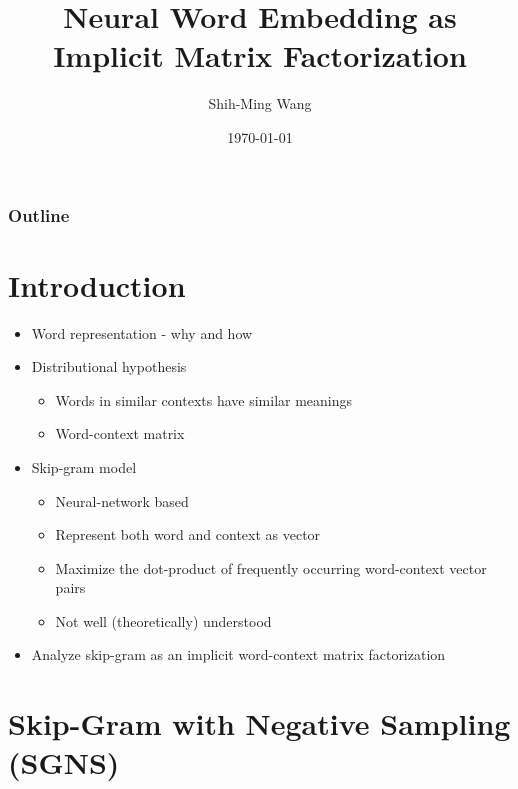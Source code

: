 \documentclass[compress]{beamer}
\title{Neural Word Embedding as Implicit Matrix Factorization}
\author{Shih-Ming Wang}
\institute{NLPLab, Institute of Information Science, Academia Sinica}
\date{\today}
\begin{document}
\beamertemplatenavigationsymbolsempty

\begin{frame}
 \maketitle
\end{frame}

\begin{frame}
 \frametitle{Outline}
 \tableofcontents
\end{frame}
\section{Introduction}
\begin{frame}{\secname}
\begin{itemize}
  \item Word representation - why and how
  \item Distributional hypothesis
    \begin{itemize}
      \item Words in similar contexts have similar meanings
      \item Word-context matrix
    \end{itemize}
\item Skip-gram model
   	\begin{itemize}
      \item Neural-network based
      \item Represent both word and context as vector
      \item Maximize the dot-product of frequently occurring word-context vector pairs
      \item Not well (theoretically) understood
    \end{itemize}
\item Analyze skip-gram as an implicit word-context matrix factorization
\end{itemize}
\end{frame} 
\section[Skip-Gram with NS]{Skip-Gram with Negative Sampling (SGNS)}
\end{document}
